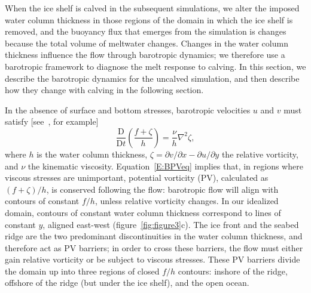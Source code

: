 \documentclass[draft]{agujournal2019}
\begin{document}
When the ice shelf is calved in the subsequent simulations, we alter the imposed water column thickness in those regions of the domain in which the ice shelf is removed, and the buoyancy flux that emerges from the simulation is changes because the total volume of meltwater changes. Changes in the water column thickness influence the flow through barotropic dynamics; we therefore use a barotropic framework to diagnose the melt response to calving. In this section, we describe the barotropic dynamics for the uncalved simulation, and then describe how they change with calving in the following section.

In the absence of surface and bottom stresses, barotropic velocities $u$ and $v$ must satisfy [see~, for example]
 \begin{equation}\label{E:BPVeq}
\frac{\mathrm{D}}{\mathrm{D}t}\left( \frac{f + \zeta}{h}\right) = \frac{\nu}{h}\nabla^2 \zeta,
 \end{equation}
where $h$ is the water column thickness, $\zeta = \partial v / \partial x - \partial u / \partial y$ the relative vorticity,  and $\nu$ the kinematic viscosity. Equation~\eqref{E:BPVeq} implies that, in regions where viscous stresses are unimportant, potential vorticity (PV),  calculated as $(f + \zeta)/h$, is conserved following the flow: barotropic flow will align with contours of constant $f/h$, unless relative vorticity changes. In our idealized domain, contours of constant water column thickness correspond to lines of constant $y$, aligned east-west (figure~\ref{fig:figure3}c). The ice front and the seabed ridge are the two predominant discontinuities in the water column thickness, and therefore act as PV barriers; in order to cross these barriers, the flow must either gain relative vorticity or be subject to viscous stresses. These PV barriers divide the domain up into three regions of closed $f/h$ contours: inshore of the ridge, offshore of the ridge (but under the ice shelf), and the open ocean.
\end{document}
